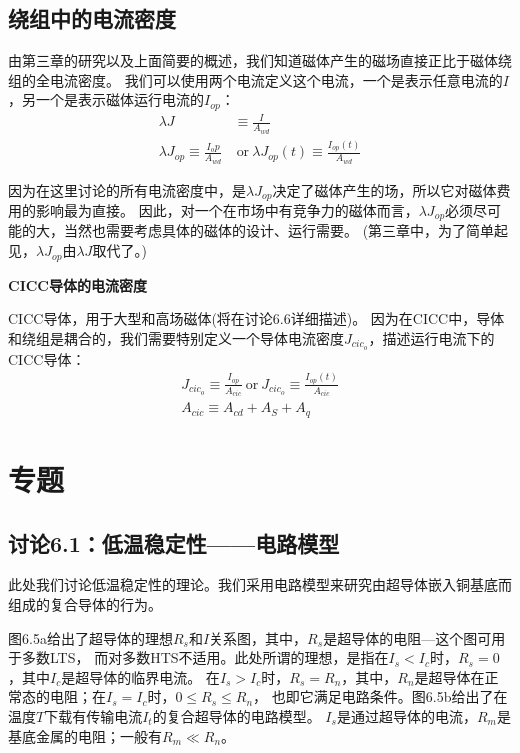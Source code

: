 \subsection{绕组中的电流密度}
由第三章的研究以及上面简要的概述，我们知道磁体产生的磁场直接正比于磁体绕组的全电流密度。
我们可以使用两个电流定义这个电流，一个是表示任意电流的$I$，另一个是表示磁体运行电流的$I_{op}$：
\begin{subequations}
	\begin{align}
	\lambda J&\equiv\frac{I}{A_{wd}}\\
	\lambda J_{op}\equiv\frac{I_op}{A_{wd}}&  \ \mbox{or}\  \lambda J_{op}(t)\equiv\frac{I_{op}(t)}{A_{wd}}
	\end{align}
\end{subequations}

因为在这里讨论的所有电流密度中，是$\lambda J_{op}$决定了磁体产生的场，所以它对磁体费用的影响最为直接。
因此，对一个在市场中有竞争力的磁体而言，$\lambda J_{op}$必须尽可能的大，当然也需要考虑具体的磁体的设计、运行需要。
(第三章中，为了简单起见，$\lambda J_{op}$由$\lambda J$取代了。)

\textbf{CICC导体的电流密度}

CICC导体，用于大型和高场磁体(将在讨论6.6详细描述)。
因为在CICC中，导体和绕组是耦合的，我们需要特别定义一个导体电流密度$J_{cic_o}$，描述运行电流下的CICC导体：
\begin{subequations}
	\begin{align}
	J_{cic_o}\equiv\frac{I_{op}}{A_{cic}}\ \mbox{or}\ J_{cic_o}\equiv\frac{I_{op}(t)}{A_{cic}}\\
	A_{cic}\equiv A_{cd}+A_S+A_q
	\end{align}
\end{subequations}


\section{专题}
\subsection{讨论6.1：低温稳定性——电路模型}
此处我们讨论低温稳定性的理论。我们采用电路模型来研究由超导体嵌入铜基底而组成的复合导体的行为。

图6.5a给出了超导体的理想$R_s$和$I$关系图，其中，$R_s$是超导体的电阻---这个图可用于多数LTS，
而对多数HTS不适用。此处所谓的理想，是指在$I_s<I_c$时，$R_s=0$，其中$I_c$是超导体的临界电流。
在$I_s>I_c$时，$R_s=R_n$，其中，$R_n$是超导体在正常态的电阻；在$I_s=I_c$时，$0\le R_s\le 	R_n$，
也即它满足电路条件。图6.5b给出了在温度$T$下载有传输电流$I_t$的复合超导体的电路模型。
$I_s$是通过超导体的电流，$R_m$是基底金属的电阻；一般有$R_m\ll R_n$。

